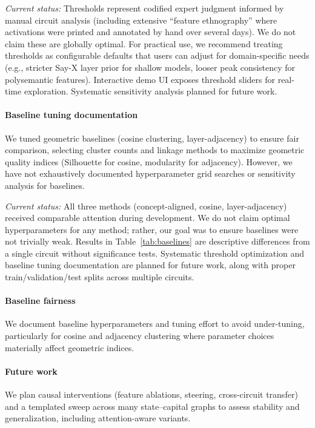 \emph{Current status:} Thresholds represent codified expert judgment informed by manual circuit analysis (including extensive ``feature ethnography'' where activations were printed and annotated by hand over several days). We do not claim these are globally optimal. For practical use, we recommend treating thresholds as configurable defaults that users can adjust for domain-specific needs (e.g., stricter Say-X layer prior for shallow models, looser peak consistency for polysemantic features). Interactive demo UI exposes threshold sliders for real-time exploration. Systematic sensitivity analysis planned for future work.

\paragraph{Baseline tuning documentation}
We tuned geometric baselines (cosine clustering, layer-adjacency) to ensure fair comparison, selecting cluster counts and linkage methods to maximize geometric quality indices (Silhouette for cosine, modularity for adjacency). However, we have not exhaustively documented hyperparameter grid searches or sensitivity analysis for baselines.

\emph{Current status:} All three methods (concept-aligned, cosine, layer-adjacency) received comparable attention during development. We do not claim optimal hyperparameters for any method; rather, our goal was to ensure baselines were not trivially weak. Results in Table~\ref{tab:baselines} are descriptive differences from a single circuit without significance tests. Systematic threshold optimization and baseline tuning documentation are planned for future work, along with proper train/validation/test splits across multiple circuits.

\paragraph{Baseline fairness}
We document baseline hyperparameters and tuning effort to avoid under-tuning, particularly for cosine and adjacency clustering where parameter choices materially affect geometric indices.

\paragraph{Future work}
We plan causal interventions (feature ablations, steering, cross-circuit transfer) and a templated sweep across many state--capital graphs to assess stability and generalization, including attention-aware variants.


